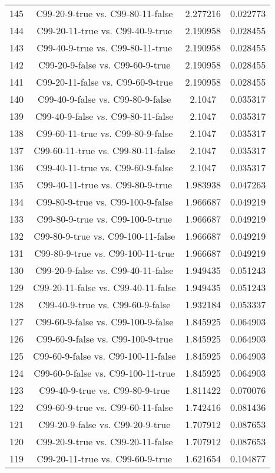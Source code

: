 \documentclass[a4paper,10pt]{article}
\begin{document}
\begin{landscape}
\begin{table}[!htp]
\begin{tabular}{cccc}
145&C99-20-9-true vs. C99-80-11-false&2.277216&0.022773\\
144&C99-20-11-true vs. C99-40-9-true&2.190958&0.028455\\
143&C99-40-9-true vs. C99-80-11-true&2.190958&0.028455\\
142&C99-20-9-false vs. C99-60-9-true&2.190958&0.028455\\
141&C99-20-11-false vs. C99-60-9-true&2.190958&0.028455\\
140&C99-40-9-false vs. C99-80-9-false&2.1047&0.035317\\
139&C99-40-9-false vs. C99-80-11-false&2.1047&0.035317\\
138&C99-60-11-true vs. C99-80-9-false&2.1047&0.035317\\
137&C99-60-11-true vs. C99-80-11-false&2.1047&0.035317\\
136&C99-40-11-true vs. C99-60-9-false&2.1047&0.035317\\
135&C99-40-11-true vs. C99-80-9-true&1.983938&0.047263\\
134&C99-80-9-true vs. C99-100-9-false&1.966687&0.049219\\
133&C99-80-9-true vs. C99-100-9-true&1.966687&0.049219\\
132&C99-80-9-true vs. C99-100-11-false&1.966687&0.049219\\
131&C99-80-9-true vs. C99-100-11-true&1.966687&0.049219\\
130&C99-20-9-false vs. C99-40-11-false&1.949435&0.051243\\
129&C99-20-11-false vs. C99-40-11-false&1.949435&0.051243\\
128&C99-40-9-true vs. C99-60-9-false&1.932184&0.053337\\
127&C99-60-9-false vs. C99-100-9-false&1.845925&0.064903\\
126&C99-60-9-false vs. C99-100-9-true&1.845925&0.064903\\
125&C99-60-9-false vs. C99-100-11-false&1.845925&0.064903\\
124&C99-60-9-false vs. C99-100-11-true&1.845925&0.064903\\
123&C99-40-9-true vs. C99-80-9-true&1.811422&0.070076\\
122&C99-60-9-true vs. C99-60-11-false&1.742416&0.081436\\
121&C99-20-9-false vs. C99-20-9-true&1.707912&0.087653\\
120&C99-20-9-true vs. C99-20-11-false&1.707912&0.087653\\
119&C99-20-11-true vs. C99-60-9-true&1.621654&0.104877\\

\end{tabular}
\end{table}
\end{landscape}
\end{document}

